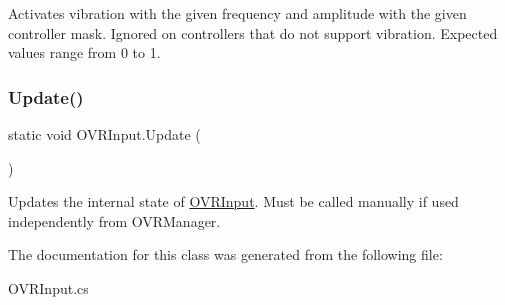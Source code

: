 Activates vibration with the given frequency and amplitude with the given controller mask. Ignored on controllers that do not support vibration. Expected values range from 0 to 1. 

\mbox{\label{class_o_v_r_input_a6dfa622504b96b15183e4ba1b2e91575}} 
\subsubsection{\texorpdfstring{Update()}{Update()}}
{\footnotesize\ttfamily static void O\+V\+R\+Input.\+Update (\begin{DoxyParamCaption}{ }\end{DoxyParamCaption})\hspace{0.3cm}{\ttfamily [static]}}



Updates the internal state of \mbox{\hyperlink{class_o_v_r_input}{O\+V\+R\+Input}}. Must be called manually if used independently from O\+V\+R\+Manager. 



The documentation for this class was generated from the following file\+:\begin{DoxyCompactItemize}
\item 
O\+V\+R\+Input.\+cs\end{DoxyCompactItemize}
